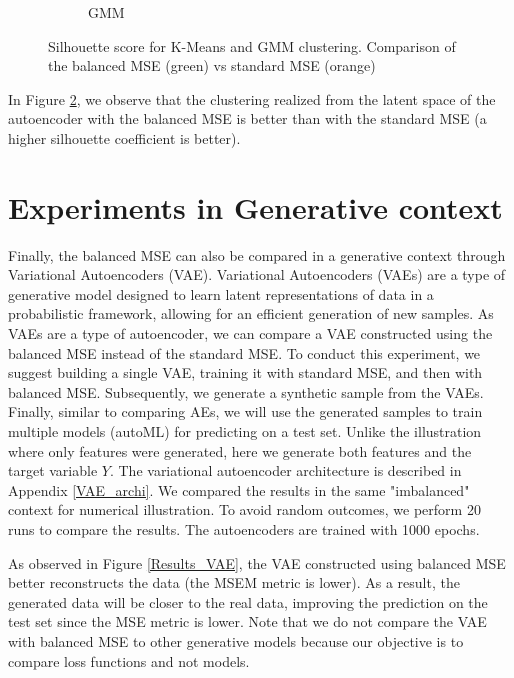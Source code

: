 \documentclass{article}
\theoremstyle{definition}
\begin{document}
\begin{figure}[ht]
\begin{subfigure}[b]{0.22\textwidth}
         \caption{GMM}
         \label{Silhouette_GMM}
     \end{subfigure}
     \caption{Silhouette score for K-Means and GMM clustering. Comparison of the balanced MSE (green) vs standard MSE (orange)}
     \label{Silhouette}
\end{figure}

In Figure \ref{Silhouette}, we observe that the clustering realized from the latent space of the autoencoder with the balanced MSE is better than with the standard MSE (a higher silhouette coefficient is better). 



\section{Experiments in Generative context} 
\label{XP_generative}
Finally, the balanced MSE can also be compared in a generative context through Variational Autoencoders (VAE). Variational Autoencoders (VAEs) are a type of generative model designed to learn latent representations of data in a probabilistic framework, allowing for an efficient generation of new samples. As VAEs are a type of autoencoder, we can compare a VAE constructed using the balanced MSE instead of the standard MSE.
To conduct this experiment, we suggest building a single VAE, training it with standard MSE, and then with balanced MSE. Subsequently, we generate a synthetic sample from the VAEs. Finally, similar to comparing AEs, we will use the generated samples to train multiple models (autoML) for predicting on a test set. Unlike the illustration where only features were generated, here we generate both features and the target variable $Y$.
The variational autoencoder architecture is described in Appendix \ref{VAE_archi}. We compared the results in the same "imbalanced" context for numerical illustration. To avoid random outcomes, we perform 20 runs to compare the results. The autoencoders are trained with 1000 epochs.

As observed in Figure  \ref{Results_VAE}, the VAE constructed using balanced MSE better reconstructs the data (the MSEM metric is lower). As a result, the generated data will be closer to the real data, improving the prediction on the test set since the MSE metric is lower. Note that we do not compare the VAE with balanced MSE to other generative models because our objective is to compare loss functions and not models.
\end{document}

